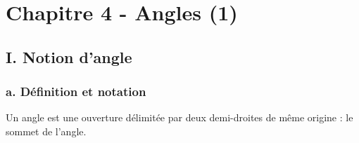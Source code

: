 
\section*{Chapitre 4 - Angles (1)}

\subsection*{I. Notion d'angle}

\subsubsection*{a. Définition et notation}

\begin{Définition}
Un angle est une ouverture délimitée par deux demi-droites de même origine : le sommet de l'angle.
\end{Définition}

